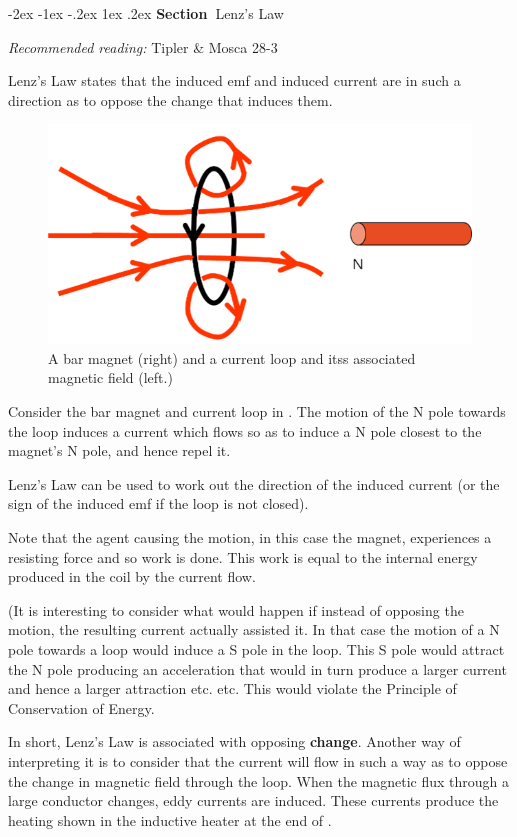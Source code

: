 \documentclass[
]{book}
\makeatletter
\renewcommand\section{%
\@startsection{section}{1}{\z@}%
              {-2ex \@plus -1ex \@minus -.2ex}%
              {1ex \@plus .2ex}%
              {\sffamily\bfseries\large\noindent Section~}}
\numberwithin{equation}{section}
\makeatother
\begin{document}
\hypertarget{lenzs-law}{%
\section{Lenz's Law}\label{lenzs-law}}

\emph{Recommended reading:} Tipler \& Mosca 28-3

Lenz's Law states that the induced emf and induced current are in such a
direction as to oppose the change that induces them.

\begin{figure}

{\centering \includegraphics[width=0.7\linewidth]{Figures/movingMag} 

}

\caption{A bar magnet (right) and a current loop and itss associated magnetic field (left.)}\label{fig:movingMag}
\end{figure}

Consider the bar magnet and current loop in . The motion of the N pole
towards the loop induces a current which flows so as to induce a N pole
closest to the magnet's N pole, and hence repel it.

Lenz's Law can be used to work out the direction of the induced current
(or the sign of the induced emf if the loop is not closed).

Note that the agent causing the motion, in this case the magnet,
experiences a resisting force and so work is done. This work is equal to
the internal energy produced in the coil by the current flow.

(It is interesting to consider what would happen if instead of opposing
the motion, the resulting current actually assisted it. In that case the
motion of a N pole towards a loop would induce a S pole in the loop.
This S pole would attract the N pole producing an acceleration that
would in turn produce a larger current and hence a larger attraction
etc. etc. This would violate the Principle of Conservation of Energy.

In short, Lenz's Law is associated with opposing \textbf{change}. Another way
of interpreting it is to consider that the current will flow in such a
way as to oppose the change in magnetic field through the loop. When the
magnetic flux through a large conductor changes, eddy currents are
induced. These currents produce the heating shown in the inductive
heater at the end of .
\end{document}
